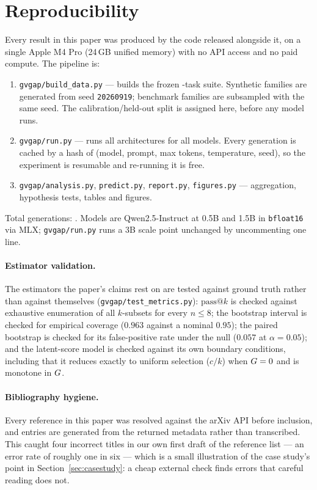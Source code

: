 \section{Reproducibility}
\label{app:repro}

Every result in this paper was produced by the code released alongside it, on a
single Apple M4 Pro (24\,GB unified memory) with no API access and no paid
compute. The pipeline is:

\begin{enumerate}[leftmargin=1.4em,itemsep=1pt,topsep=3pt]
\item \texttt{gvgap/build\_data.py} --- builds the frozen \nTasks{}-task suite.
  Synthetic families are generated from seed \texttt{20260919}; benchmark
  families are subsampled with the same seed. The calibration/held-out split is
  assigned here, before any model runs.
\item \texttt{gvgap/run.py} --- runs all architectures for all models. Every
  generation is cached by a hash of (model, prompt, max tokens, temperature,
  seed), so the experiment is resumable and re-running it is free.
\item \texttt{gvgap/analysis.py}, \texttt{predict.py}, \texttt{report.py},
  \texttt{figures.py} --- aggregation, hypothesis tests, tables and figures.
\end{enumerate}

\noindent
Total generations: \nGenerations{}. Models are Qwen2.5-Instruct at 0.5B and 1.5B \citep{qwen2024qwen25} in \texttt{bfloat16} via MLX; \texttt{gvgap/run.py} runs a 3B scale point unchanged by uncommenting one line.

\paragraph{Estimator validation.} The estimators the paper's claims rest on are
tested against ground truth rather than against themselves
(\texttt{gvgap/test\_metrics.py}): $\mathrm{pass}@k$ is checked against
exhaustive enumeration of all $k$-subsets for every $n \le 8$; the bootstrap
interval is checked for empirical coverage ($0.963$ against a nominal $0.95$);
the paired bootstrap is checked for its false-positive rate under the null
($0.057$ at $\alpha=0.05$); and the latent-score model is checked against its own
boundary conditions, including that it reduces exactly to uniform selection
($c/k$) when $G=0$ and is monotone in $G$.

\paragraph{Bibliography hygiene.} Every reference in this paper was resolved
against the arXiv API before inclusion, and entries are generated from the
returned metadata rather than transcribed. This caught four incorrect titles in
our own first draft of the reference list --- an error rate of roughly one in
six --- which is a small illustration of the case study's point in
Section~\ref{sec:casestudy}: a cheap external check finds errors that careful
reading does not.

